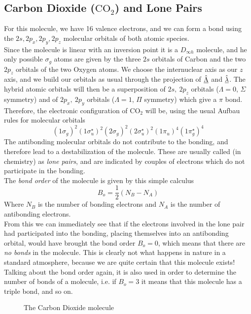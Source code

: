 \documentclass[../qm.tex]{subfiles}
\begin{document}
	\subsection{Carbon Dioxide ($\mathrm{CO_2}$) and Lone Pairs}
	For this molecule, we have 16 valence electrons, and we can form a bond using the $2s,2p_x,2p_y,2p_z$ molecular orbitals of both atomic species.\\
	Since the molecule is linear with an inversion point it is a $D_{\infty h}$ molecule, and he only possible $\sigma_g$ atoms are given by the three $2s$ orbitals of Carbon and the two $2p_z$ orbitals of the two Oxygen atoms. We choose the internuclear axis as our $z$ axis, and we build our orbitals as usual through the projection of $\hat{\underline{\Lambda}}$ and $\hat{\underline{\lambda}}$. The hybrid atomic orbitals will then be a superposition of $2s,\ 2p_z$ orbitals ($\Lambda=0$, $\Sigma$ symmetry) and of $2p_x,\ 2p_y$ orbitals ($\Lambda=1$, $\Pi$ symmetry) which give a $\pi$ bond.\\
	Therefore, the electronic configuration of $\mathrm{CO_2}$ will be, using the usual Aufbau rules for molecular orbitals
	\begin{equation}
		(1\sigma_g)^2(1\sigma_u^{\star})^2(2\sigma_g)^2(2\sigma_u^{\star})^2(1\pi_u)^4(1\pi_g^{\star})^4
		\label{eq:co2configuration}
	\end{equation}
	The antibonding molecular orbitals do not contribute to the bonding, and therefore lead to a destabilization of the molecule. These are usually called (in chemistry) as \textit{lone pairs}, and are indicated by couples of electrons which do not participate in the bonding.\\
	The \textit{bond order} of the molecule is given by this simple calculus
	\begin{equation}
		B_o=\frac{1}{2}\left( N_B-N_A \right)
		\label{eq:bondorder}
	\end{equation}
	Where $N_B$ is the number of bonding electrons and $N_A$ is the number of antibonding electrons.\\
	From this we can immediately see that if the electrons involved in the lone pair had participated into the bonding, placing themselves into an antibonding orbital, would have brought the bond order $B_o=0$, which means that there are \textit{no bonds} in the molecule. This is clearly not what happens in nature in a standard atmosphere, because we are quite certain that this molecule exists!\\
	Talking about the bond order again, it is also used in order to determine the number of bonds of a molecule, i.e. if $B_o=3$ it means that this molecule has a triple bond, and so on.
	\begin{figure}[H]
		\centering
		\caption{The Carbon Dioxide molecule}
		\label{fig:co2}
	\end{figure}
\end{document}
